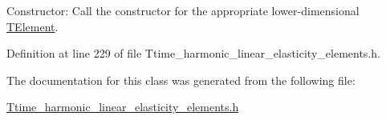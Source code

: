 Constructor\+: Call the constructor for the appropriate lower-\/dimensional \hyperlink{classoomph_1_1TElement}{T\+Element}. 



Definition at line 229 of file Ttime\+\_\+harmonic\+\_\+linear\+\_\+elasticity\+\_\+elements.\+h.



The documentation for this class was generated from the following file\+:\begin{DoxyCompactItemize}
\item 
\hyperlink{Ttime__harmonic__linear__elasticity__elements_8h}{Ttime\+\_\+harmonic\+\_\+linear\+\_\+elasticity\+\_\+elements.\+h}\end{DoxyCompactItemize}
